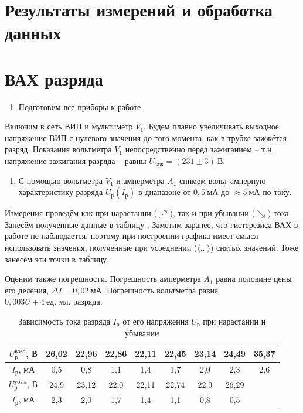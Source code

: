 \documentclass[a4paper,12pt]{article}
\begin{document}
\section{Результаты измерений и обработка данных}

\section*{ВАХ разряда}

\begin{enumerate}
    \item Подготовим все приборы к работе.
\end{enumerate}
Включим в сеть ВИП и мультиметр $V_1$. Будем плавно увеличивать выходное напряжение ВИП с нулевого значения до того момента, как в трубке зажжётся разряд. Показания вольтметра $V_1$ непосредственно перед зажиганием -- т.н. напряжение зажигания разряда -- равны $U_{\text{заж}}=\left(231\pm3\right)~\text{В}$.

\begin{enumerate}[resume]
    \item С помощью вольтметра $V_1$ и амперметра $A_1$ снимем вольт-амперную характеристику разряда $U_{\text{р}}\left(I_{\text{р}}\right)$ в диапазоне от $0,5~\text{мА}$ до $\approx5~\text{мА}$ по току.
\end{enumerate}
Измерения проведём как при нарастании ($\nearrow$), так и при убывании ($\searrow$) тока. Занесём полученные данные в таблицу . Заметим заранее, что гистерезиса ВАХ в работе не наблюдается, поэтому при построении графика имеет смысл использовать значения, полученные при усреднении ($\langle\ldots\rangle$) снятых значений. Тоже занесём эти точки в таблицу.

Оценим также погрешности. Погрешность амперметра $A_1$ равна половине цены его деления, $\Delta I=0,02~\text{мА}$. Погрешность вольтметра равна $0,003U+4~\text{ед. мл. разряда}$.


\begin{table}[h]
	\centering
	\caption{Зависимость тока разряда $I_{\text{р}}$ от его напряжения $U_{\text{р}}$ при нарастании и убывании} \label{VAH}
	\begin{tabular}{|c|c|c|c|c|c|c|c|c|}
		\hline
        $U_{\text{р}}^\text{возр}$, В & 26,02 & 22,96 & 22,86 & 22,11 & 22,45 & 23,14 & 24,49 & 35,37 \\ \hline
		$I_{\text{р}}$, мА & 0,5 & 0,8 & 1,1 & 1,4 & 1,7 & 2,0 & 2,3 & 2,6 \\ \hline \hline
		$U_{\text{р}}^\text{убыв}$, В & 24,9 & 23,12 & 22,0 & 22,11 & 22,74 & 22,9 & 26,29 & ~ \\ \hline
        $I_{\text{р}}$, мА & 2,3 & 2,0 & 1,7 & 1,4 & 1,1 & 0,8 & 0,5 & ~ \\ \hline
	\end{tabular}
\end{table}
\end{document}
